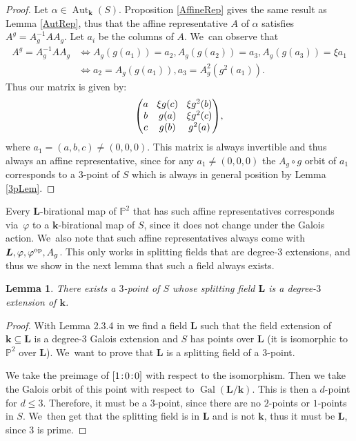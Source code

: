 \documentclass[JEP,XML,SOM,Unicode,NoFloatCountersInSection, NoEqCountersInSection,published]{cedram}
\newcommand{\op}{\textup{op}}
\newcommand{\sep}{\mkern2mu{:}\mkern2mu}
\DeclareMathOperator{\Gal}{Gal}
\newtheorem{lemma}[theorem]{Lemma}
\theoremstyle{definition}
\newcommand{\kk}{{\boldsymbol{k}}}
\newcommand{\LL}{{\boldsymbol{L}}}
\DeclareMathOperator{\Aut}{Aut}
\begin{document}
\begin{proof}
Let $\alpha \in \Aut_{\kk}(S)$. Proposition \ref{AffineRep} gives the same result as Lemma \ref{AutRep}, thus that the affine representative $A$ of $\alpha$ satisfies $A^g = A_g^{-1} A A_g$. Let $a_i$ be the columns of $A$. We~can observe that
\begin{align*}
A^g = A_g^{-1} A A_g &\iff A_g(g(a_1)) = a_2, A_g(g(a_2)) = a_3, A_g(g(a_3)) = \xi a_1
\\
&\iff a_2 = A_g(g(a_1)), a_3 = A_g^2(g^2(a_1)).
\end{align*}
Thus our matrix is given by:
\begin{equation*}\arraycolsep4.5pt
\begin{pmatrix}
a & \xi g(c) & \xi g^2(b) \\
b & g(a) & \xi g^2(c) \\
c & g(b) & g^2(a)
\end{pmatrix}\!,
\end{equation*}
where $a_1 = (a,b,c) \neq (0,0,0)$. This matrix is always invertible and thus always an affine representative, since for any $a_1 \neq (0,0,0)$ the $A_g \circ g$ orbit of $a_1$ corresponds to a $3$\nobreakdash-point of $S$ which is always in general position by Lemma \ref{3pLem}.
\end{proof}
Every $\LL$-birational map of $\mathbb{P}^2$ that has such affine representatives corresponds via~$\varphi$ to a $\kk$-birational map of $S$, since it does not change under the Galois action. We~also note that such affine representatives always come with $\LL,\varphi, \varphi^{\op}, A_g$. This only works in splitting fields that are degree-$3$ extensions, and thus we show in the next lemma that such a field always exists.

\begin{lemma} \label{lem: goodSplit}
There exists a $3$\nobreakdash-point of $S$ whose splitting field $\LL$ is a degree-$3$ extension of $\kk$.
\end{lemma}

\begin{proof}
With Lemma 2.3.4 in \cite{BSY} we find a field $\LL$ such that the field extension of $\kk \subseteq \LL$ is a degree-$3$ Galois extension and $S$ has points over $\LL$ (it is isomorphic to~$\mathbb{P}^2$ over $\LL$). We~want to prove that $\LL$ is a splitting field of a $3$\nobreakdash-point.

We take the preimage of $[1\sep 0\sep 0]$ with respect to the isomorphism. Then we take the Galois orbit of this point with respect to $\Gal(\LL/\kk)$. This is then a $d$-point for $d \leq 3$. Therefore, it must be a $3$\nobreakdash-point, since there are no $2$-points or $1$-points in $S$. We~then get that the splitting field is in $\LL$ and is not $\kk$, thus it must be $\LL$, since $3$ is prime.
\end{proof}
\end{document}
